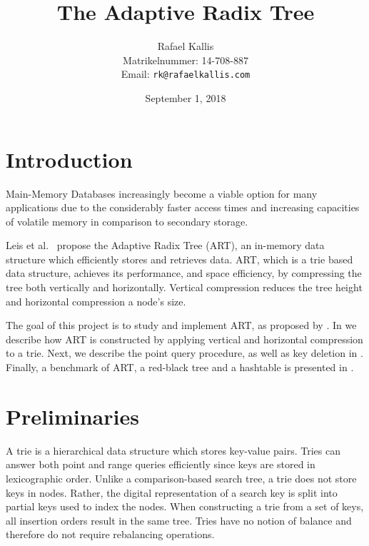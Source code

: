 \documentclass[abstracton,12pt]{scrartcl}
\title{The Adaptive Radix Tree}
\author{
    Rafael Kallis\\[-5pt]
    \scriptsize Matrikelnummer: 14-708-887\\[-5pt]
    \scriptsize Email: \texttt{rk@rafaelkallis.com}
}
\date{\vspace*{2cm}September 1, 2018}
\theoremstyle{definition}
\begin{document}
\maketitle





\newpage
\section{Introduction}

Main-Memory Databases increasingly become a viable option for many applications
due to the considerably faster access times and increasing capacities of 
volatile memory in comparison to secondary storage.

Leis et al.\ \cite{leis2013adaptive} propose the Adaptive Radix Tree (ART), an in-memory
data structure which efficiently stores and retrieves data.
ART, which is a trie based data structure, achieves its performance, and space
efficiency, by compressing the tree both vertically and horizontally.
Vertical compression reduces the tree height and horizontal compression
a node's size.

The goal of this project is to study and implement ART, as proposed by 
\cite{leis2013adaptive}. 
In  we describe how ART is constructed by applying 
vertical and horizontal compression to a trie.
Next, we describe the point query procedure, as well as 
key deletion in .
Finally, a benchmark of ART, a red-black tree and a hashtable
is presented in .

\section{Preliminaries}\label{sec:preliminaries}

A trie \cite{fredkin1960trie} is a hierarchical data structure which
stores key-value pairs. Tries can answer both point and range queries 
efficiently since keys are stored in lexicographic order.
Unlike a comparison-based search tree, a trie does not store keys in nodes.
Rather, the digital representation of a search key is split into partial
keys used to index the nodes. When 
constructing a trie from a set of keys, all insertion orders result in the 
same tree. Tries have no notion of balance and therefore do not require 
rebalancing operations.
\end{document}
